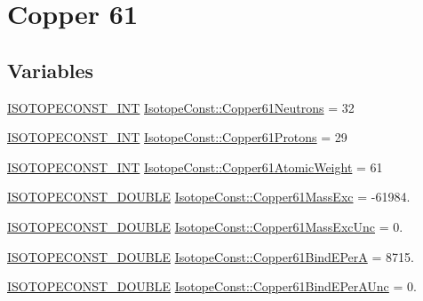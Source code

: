 \hypertarget{group___isotope_const-_copper-_cu61}{}\section{Copper 61}
\label{group___isotope_const-_copper-_cu61}
\subsection*{Variables}
\begin{DoxyCompactItemize}
\item 
\mbox{\hyperlink{group___isotope_const-_macros_ga5f18360b3e99483a35c32d789e62621c}{I\+S\+O\+T\+O\+P\+E\+C\+O\+N\+S\+T\+\_\+\+I\+NT}} \mbox{\hyperlink{group___isotope_const-_copper-_cu61_gaa203dafd7673aa59921e67920d9aecf7}{Isotope\+Const\+::\+Copper61\+Neutrons}} = 32
\item 
\mbox{\hyperlink{group___isotope_const-_macros_ga5f18360b3e99483a35c32d789e62621c}{I\+S\+O\+T\+O\+P\+E\+C\+O\+N\+S\+T\+\_\+\+I\+NT}} \mbox{\hyperlink{group___isotope_const-_copper-_cu61_gad0ba469a1b30d19967d9b68ddf288620}{Isotope\+Const\+::\+Copper61\+Protons}} = 29
\item 
\mbox{\hyperlink{group___isotope_const-_macros_ga5f18360b3e99483a35c32d789e62621c}{I\+S\+O\+T\+O\+P\+E\+C\+O\+N\+S\+T\+\_\+\+I\+NT}} \mbox{\hyperlink{group___isotope_const-_copper-_cu61_gafd09875d2e52fd2dd07048b10754dda0}{Isotope\+Const\+::\+Copper61\+Atomic\+Weight}} = 61
\item 
\mbox{\hyperlink{group___isotope_const-_macros_ga8f45a7272ce02c0b4c65c44636ed719a}{I\+S\+O\+T\+O\+P\+E\+C\+O\+N\+S\+T\+\_\+\+D\+O\+U\+B\+LE}} \mbox{\hyperlink{group___isotope_const-_copper-_cu61_gaaecd4172490d27050b64d4be4f5a60d5}{Isotope\+Const\+::\+Copper61\+Mass\+Exc}} = -\/61984.
\item 
\mbox{\hyperlink{group___isotope_const-_macros_ga8f45a7272ce02c0b4c65c44636ed719a}{I\+S\+O\+T\+O\+P\+E\+C\+O\+N\+S\+T\+\_\+\+D\+O\+U\+B\+LE}} \mbox{\hyperlink{group___isotope_const-_copper-_cu61_ga871ba874ad055c8c852882f826a71d37}{Isotope\+Const\+::\+Copper61\+Mass\+Exc\+Unc}} = 0.
\item 
\mbox{\hyperlink{group___isotope_const-_macros_ga8f45a7272ce02c0b4c65c44636ed719a}{I\+S\+O\+T\+O\+P\+E\+C\+O\+N\+S\+T\+\_\+\+D\+O\+U\+B\+LE}} \mbox{\hyperlink{group___isotope_const-_copper-_cu61_gafb66a465972d050fe8598ac5ed3c59f0}{Isotope\+Const\+::\+Copper61\+Bind\+E\+PerA}} = 8715.
\item 
\mbox{\hyperlink{group___isotope_const-_macros_ga8f45a7272ce02c0b4c65c44636ed719a}{I\+S\+O\+T\+O\+P\+E\+C\+O\+N\+S\+T\+\_\+\+D\+O\+U\+B\+LE}} \mbox{\hyperlink{group___isotope_const-_copper-_cu61_ga9f670dd8b203e481814ca003279fcde7}{Isotope\+Const\+::\+Copper61\+Bind\+E\+Per\+A\+Unc}} = 0.

\end{DoxyCompactItemize}
